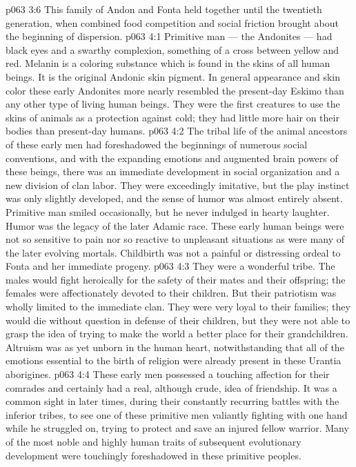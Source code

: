 \vs p063 3:6 \pc This family of Andon and Fonta held together until the twentieth generation, when combined food competition and social friction brought about the beginning of dispersion.
\vs p063 4:1 Primitive man --- the Andonites --- had black eyes and a swarthy complexion, something of a cross between yellow and red. Melanin is a coloring substance which is found in the skins of all human beings. It is the original Andonic skin pigment. In general appearance and skin color these early Andonites more nearly resembled the present\hyp{}day Eskimo than any other type of living human beings. They were the first creatures to use the skins of animals as a protection against cold; they had little more hair on their bodies than present\hyp{}day humans.
\vs p063 4:2 The tribal life of the animal ancestors of these early men had foreshadowed the beginnings of numerous social conventions, and with the expanding emotions and augmented brain powers of these beings, there was an immediate development in social organization and a new division of clan labor. They were exceedingly imitative, but the play instinct was only slightly developed, and the sense of humor was almost entirely absent. Primitive man smiled occasionally, but he never indulged in hearty laughter. Humor was the legacy of the later Adamic race. These early human beings were not so sensitive to pain nor so reactive to unpleasant situations as were many of the later evolving mortals. Childbirth was not a painful or distressing ordeal to Fonta and her immediate progeny.
\vs p063 4:3 \pc They were a wonderful tribe. The males would fight heroically for the safety of their mates and their offspring; the females were affectionately devoted to their children. But their patriotism was wholly limited to the immediate clan. They were very loyal to their families; they would die without question in defense of their children, but they were not able to grasp the idea of trying to make the world a better place for their grandchildren. Altruism was as yet unborn in the human heart, notwithstanding that all of the emotions essential to the birth of religion were already present in these Urantia aborigines.
\vs p063 4:4 These early men possessed a touching affection for their comrades and certainly had a real, although crude, idea of friendship. It was a common sight in later times, during their constantly recurring battles with the inferior tribes, to see one of these primitive men valiantly fighting with one hand while he struggled on, trying to protect and save an injured fellow warrior. Many of the most noble and highly human traits of subsequent evolutionary development were touchingly foreshadowed in these primitive peoples.
